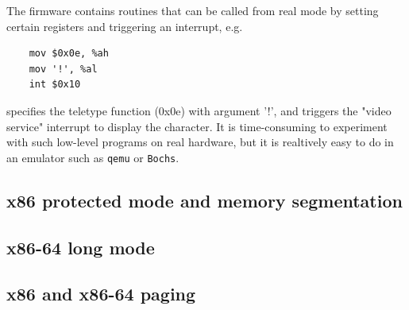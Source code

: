 \documentclass[toc]{../cs-classes/cs-classes}
\begin{document}
The firmware contains routines that can be called from real mode by setting certain registers and triggering an interrupt, e.g.
\begin{verbatim}
    mov $0x0e, %ah
    mov '!', %al
    int $0x10
\end{verbatim}
specifies the teletype function (0x0e) with argument '!', and triggers the "video service" interrupt to display the character. It is time-consuming to experiment with such low-level programs on real hardware, but it is realtively easy to do in an emulator such as \texttt{qemu} or \texttt{Bochs}.

\subsection{x86 protected mode and memory segmentation}

\subsection{x86-64 long mode}

\subsection{x86 and x86-64 paging}
\end{document}
